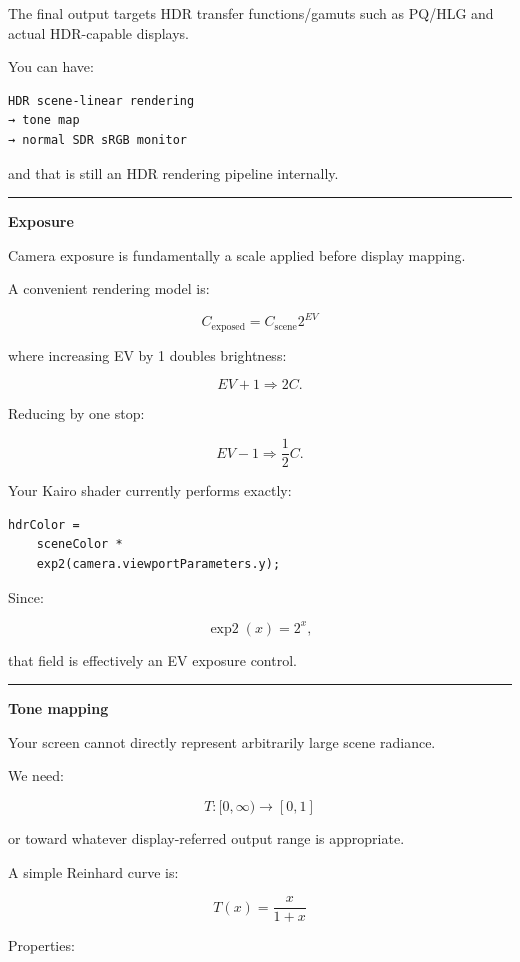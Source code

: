 The final output targets HDR transfer functions/gamuts such as PQ/HLG and actual HDR-capable displays.

You can have:

\begin{verbatim}
HDR scene-linear rendering
→ tone map
→ normal SDR sRGB monitor
\end{verbatim}

and that is still an HDR rendering pipeline internally.

\begin{center}\rule{0.5\linewidth}{0.5pt}\end{center}

\textbf{Exposure}

Camera exposure is fundamentally a scale applied before display mapping.

A convenient rendering model is:

\[
\boxed{
C_{\text{exposed}}
=
C_{\text{scene}}2^{EV}
}
\]

where increasing EV by 1 doubles brightness:

\[
EV+1
\Rightarrow
2C.
\]

Reducing by one stop:

\[
EV-1
\Rightarrow
\frac12C.
\]

Your Kairo shader currently performs exactly:

\begin{verbatim}
hdrColor =
    sceneColor *
    exp2(camera.viewportParameters.y);
\end{verbatim}

Since:

\[
\operatorname{exp2}(x)=2^x,
\]

that field is effectively an EV exposure control.

\begin{center}\rule{0.5\linewidth}{0.5pt}\end{center}

\textbf{Tone mapping}

Your screen cannot directly represent arbitrarily large scene radiance.

We need:

\[
\boxed{
T:
[0,\infty)
\rightarrow
[0,1]
}
\]

or toward whatever display-referred output range is appropriate.

A simple Reinhard curve is:

\[
\boxed{
T(x)=\frac{x}{1+x}
}
\]

Properties:

